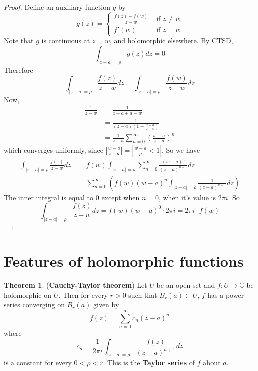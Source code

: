 \documentclass[12pt,a4paper]{article}
\theoremstyle{definition}
\newtheorem{theorem}[definition]{Theorem}
\begin{document}
\begin{proof}
	Define an auxiliary function $g$ by
	\[
		g(z) = \begin{cases}
			\frac{f(z) - f(w)}{z - w} & \text{ if } z \ne w \\
			f'(w) & \text{ if } z = w
		\end{cases}
	\]
	Note that $g$ is continuous at $z = w$, and holomorphic elsewhere. By CTSD,
	\[
		\int_{|z - a| = \rho} g(z) dz = 0
	\]
	Therefore
	\[
		\int_{|z - a| = \rho} \frac{f(z)}{z - w} dz = \int_{|z - a| = \rho} \frac{f(w)}{z - w} dz
	\]
	Now,
	\[
		\begin{aligned}
			\frac{1}{z - w}
				& = \frac{1}{z - a + a - w} \\
				& = \frac{1}{(z - a)(1 - \frac{w - a}{z - a})} \\
				& = \frac{1}{z - a} \sum_{n = 0}^{\infty} {\left( \frac{w - a}{z - a} \right)}^n
		\end{aligned}
	\]
	which converges uniformly, since $|\frac{w - a}{z - a}| = |\frac{w - a}{\rho} < 1|$.
	So we have
	\[
		\begin{aligned}
			\int_{|z - a| = \rho} \frac{f(z)}{z - w} dz
				& = f(w) \int_{|z - a| = \rho} \sum_{n = 0}^{\infty} \frac{{(w - a)}^n}{{(z - a)}^{n + 1}} dz \\
				& = \sum_{n = 0}^{\infty} \left( f(w) {(w - a)}^n \int_{|z - a| = \rho} \frac{1}{{(z - a)}^{n + 1}} dz \right)
		\end{aligned}
	\]
	The inner integral is equal to $0$ except when $n = 0$, when it's value is $2 \pi i$. So
	\[
		\int_{|z - a| = \rho} \frac{f(z)}{z - w} dz = f(w) {(w - a)}^0 \cdot 2 \pi i = 2 \pi i \cdot f(w)
	\]
\end{proof}

\section{Features of holomorphic functions}

\begin{theorem}
	(\textbf{Cauchy-Taylor theorem}) Let $U$ be an open set and $f: U \rightarrow \mathbb{C}$ be holomorphic on $U$. Then for every $r > 0$ such that $B_r(a) \subset U$, $f$ has a power series converging on $B_r(a)$ given by
	\[
		f(z) = \sum_{n = 0}^{\infty} c_n {(z - a)}^n
	\]
	where
	\[
		c_n = \frac{1}{2 \pi i} \int_{|z - a| = \rho} \frac{f(z)}{{(z - a)}^{n + 1}} dz
	\]
	is a constant for every $0 < \rho < r$. This is the \textbf{Taylor series} of $f$ about $a$.
\end{theorem}
\end{document}
